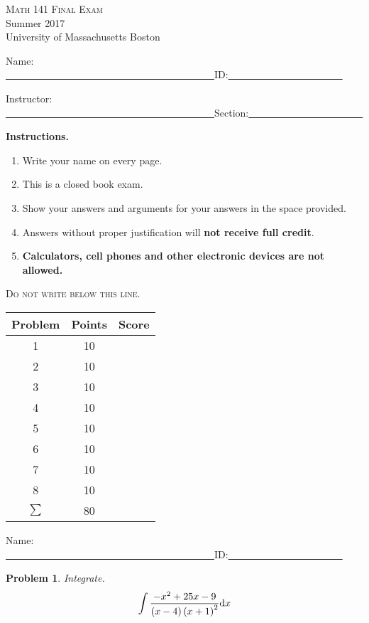 \documentclass[12pt]{article}
\newtheorem{problem}{Problem}
\newcommand{\diff}{{\normalfont \text{d}}}
\newcommand{\startUMBExamPage}{\newpage
\noindent Name: \underline{~~~~~~~~~~~~~~~~~~~~~~~~~~~~~~~~~~~~~~~~~~}\hfill ID:\underline{~~~~~~~~~~~~~~~~~~~~~~~}}
\begin{document}
\begin{center}
\Huge 
\Huge
\textsc{Math 141 Final Exam}\\
\Large Summer 2017\\
University of Massachusetts Boston
\end{center}

\medskip

\noindent Name: \underline{~~~~~~~~~~~~~~~~~~~~~~~~~~~~~~~~~~~~~~~~~~}\hfill ID:\underline{~~~~~~~~~~~~~~~~~~~~~~~}

\bigskip

\noindent Instructor: \underline{~~~~~~~~~~~~~~~~~~~~~~~~~~~~~~~~~~~~~~~~~~}\hfill Section:\underline{~~~~~~~~~~~~~~~~~~~~~~~}


\bigskip

\bigskip


\textbf{Instructions.}
\begin{enumerate}
\item Write your name on every page.
\item This is a closed book exam.
\item Show your answers and arguments for your answers in the space provided.
\item Answers without proper justification will \textbf{not receive full credit}.
\item \textbf{Calculators, cell phones and other electronic devices are not allowed.}
\end{enumerate}

\hrulefill \textsc{Do not write below this line. }\hrulefill

\vfill
{\Large
\begin{tabular}{|c|c|c|}\hline
Problem & Points & Score\\\hline\hline
1&  10&\\\hline
2&  10&\\\hline
3&  10&\\\hline
4&  10&\\\hline
5&  10&\\\hline
6&  10&\\\hline
7&  10&\\\hline
8&  10&\\\hline
$\sum$ & 80 &\\\hline
\end{tabular}
}
\startUMBExamPage
\begin{problem}
Integrate. 
\[
\displaystyle \int \frac{- x^{2}+25 x-9}{\left(x-4\right) \left(x+1\right)^{2}} \diff x
\]


\end{problem}
\end{document}
